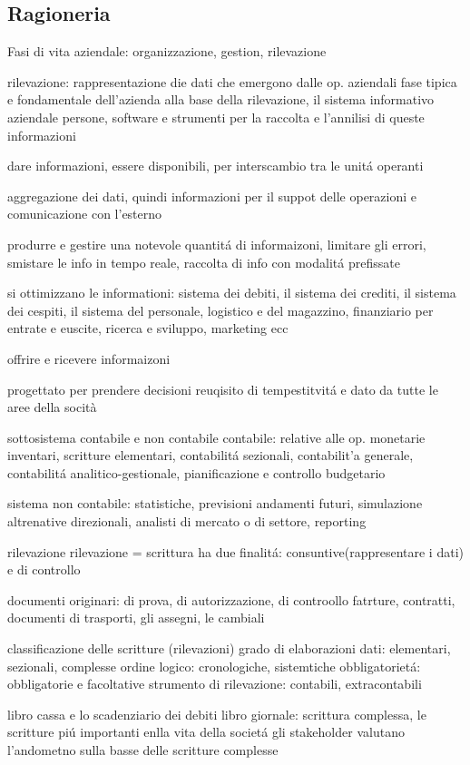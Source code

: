 \documentclass{article}
\begin{document}
\subsection{Ragioneria}
Fasi di vita aziendale: organizzazione, gestion, rilevazione

rilevazione: rappresentazione die dati che emergono dalle op. aziendali
fase tipica e fondamentale dell'azienda
alla base della rilevazione, il sistema informativo aziendale
persone, software e strumenti per la raccolta e l'annilisi di queste informazioni

dare informazioni, essere disponibili, per interscambio tra le unit\'a operanti

aggregazione dei dati, quindi informazioni per il suppot delle operazioni e comunicazione con l'esterno

produrre e gestire una notevole quantit\'a di informaizoni, limitare gli errori, smistare le info in tempo reale, raccolta di info con modalit\'a prefissate

si ottimizzano le informationi: sistema dei debiti, il sistema dei crediti, il sistema dei cespiti, il sistema del personale, logistico e del magazzino, finanziario per entrate e euscite, ricerca e sviluppo, marketing ecc

offrire e ricevere informaizoni

progettato per prendere decisioni
reuqisito di tempestitvit\'a e dato da tutte le aree della socità

sottosistema contabile e non contabile
contabile: relative alle op. monetarie
inventari, scritture elementari, contabilit\'a sezionali, contabilit'a generale, contabilit\'a analitico-gestionale, pianificazione e controllo budgetario

sistema non contabile: statistiche, previsioni andamenti futuri, simulazione altrenative direzionali, analisti di mercato o di settore, reporting

rilevazione
rilevazione = scrittura
ha due finalit\'a: consuntive(rappresentare i dati) e di controllo

documenti originari: di prova, di autorizzazione, di controollo
fatrture, contratti, documenti di trasporti, gli assegni, le cambiali

classificazione delle scritture (rilevazioni)
grado di elaborazioni dati: elementari, sezionali, complesse
ordine logico: cronologiche, sistemtiche
obbligatoriet\'a: obbligatorie e facoltative
strumento di rilevazione: contabili, extracontabili

libro cassa e lo scadenziario dei debiti
libro giornale: scrittura complessa, le scritture pi\'u importanti enlla vita della societ\'a
gli stakeholder valutano l'andometno sulla basse delle scritture complesse
\end{document}
